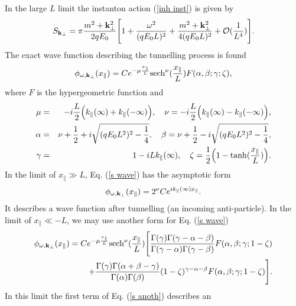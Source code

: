 \documentclass[a4paper,prd,showpacs,preprintnumbers,amsmath,amssymb]{revtex4}
\begin{document}
In the large $L$ limit the instanton action (\ref{inh inst}) is
given by
\begin{equation}
S_{{\bf k}_{\perp}} = \pi \frac{m^2 + {\bf k}^2_{\perp}}{2qE_0}
\Biggl[1 + \frac{\omega^2}{(qE_0 L)^2} +  \frac{m^2 + {\bf
k}^2_{\perp}}{4(qE_0L)^2} + {\cal O} (\frac{1}{L^4}) \Biggr].
\label{s inst}
\end{equation}
The exact wave function describing the tunnelling process is found
\begin{equation}
\phi_{\omega, {\bf k}_{\perp}} (x_{\parallel}) = C e^{- \mu
\frac{x_{\parallel}}{L}} {\rm sech}^{\nu}
(\frac{x_{\parallel}}{L}) F (\alpha, \beta; \gamma; \zeta),
\label{s wave}
\end{equation}
where $F$ is the hypergeometric function and
\begin{eqnarray}
\mu &=&  - i \frac{L}{2}\Bigl( k_{\parallel} (\infty)+
k_{\parallel} (- \infty) \Bigr), \quad \nu =  - i
\frac{L}{2}\Bigl( k_{\parallel} (\infty) - k_{\parallel} (-
\infty) \Bigr), \nonumber\\ \alpha &=& \nu + \frac{1}{2} + i
\sqrt{ (q E_0 L^2)^2 - \frac{1}{4}}, \quad \beta = \nu +
\frac{1}{2} - i \sqrt{(q E_0 L^2)^2 - \frac{1}{4}}, \nonumber\\
\gamma &=& 1 - i L k_{\parallel} (\infty), \quad \zeta =
\frac{1}{2} \Bigl(1 - \tanh(\frac{x_{\parallel}}{L}) \Bigr).
\end{eqnarray}
In the limit of $x_{\parallel} \gg L$, Eq. (\ref{s wave}) has the
asymptotic form
\begin{equation}
\phi_{\omega, {\bf k}_{\perp}} (x_{\parallel}) = 2^{\nu} C e^{i
k_{\parallel} (\infty) x_{\parallel}}. \label{s asym1}
\end{equation}
It describes a wave function after tunnelling (an incoming
anti-particle). In the limit of $x_{\parallel} \ll - L$, we may
use another form for Eq. (\ref{s wave})
\begin{eqnarray}
\phi_{\omega, {\bf k}_{\perp}} (x_{\parallel}) = C e^{- \mu
\frac{x_{\parallel}}{L}} {\rm sech}^{\nu}
(\frac{x_{\parallel}}{L}) \Biggl[\frac{\Gamma(\gamma)
\Gamma(\gamma - \alpha - \beta)}{\Gamma(\gamma - \alpha)
\Gamma(\gamma - \beta)} F (\alpha, \beta; \gamma; 1- \zeta)
\nonumber\\ + \frac{\Gamma(\gamma) \Gamma(\alpha + \beta - \gamma
)}{\Gamma(\alpha) \Gamma(\beta)} (1 - \zeta)^{\gamma - \alpha -
\beta} F (\alpha, \beta; \gamma; 1- \zeta)
 \Biggr]. \label{s anoth}
\end{eqnarray}
In this limit the first term of Eq. (\ref{s anoth}) describes an
\end{document}
